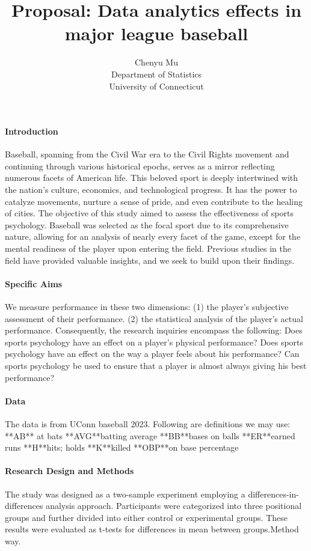 \documentclass[12pt]{article}
\title{Proposal: Data analytics effects in major league baseball}
\author{Chenyu Mu\\
  Department of Statistics\\
  University of Connecticut
}
\begin{document}
\maketitle


\paragraph{Introduction}
Baseball, spanning from the Civil War era to the Civil Rights movement and continuing through various historical epochs,
serves as a mirror reflecting numerous facets of American life. This beloved sport is deeply intertwined with the nation's culture,
economics, and technological progress. It has the power to catalyze movements, nurture a sense of pride, and even contribute to the healing of cities.
The objective of this study aimed to assess the effectiveness of sports psychology. Baseball was selected as the focal sport due to its comprehensive nature,
allowing for an analysis of nearly every facet of the game, except for the mental readiness of the player upon entering the field. Previous studies 
in the field \citep[e.g.,][]{Dalmass2018baseball} have provided valuable insights, and we seek to build upon their findings. 


\lipsum[1]

\paragraph{Specific Aims}
We measure performance in these two dimensions: (1) the player's subjective assessment of their performance. 
(2) the statistical analysis of the player's actual performance. Consequently, the research inquiries encompass the following:
Does sports psychology have an effect on a player's physical performance?
Does sports psychology have an effect on the way a player feels about his performance?
Can sports psychology be used to ensure that a player is almost always giving his best performance?

\lipsum[2]

\paragraph{Data}
The data is from UConn baseball 2023. Following are definitions we may use:
**AB** at bats 
**AVG**batting average 
**BB**bases on balls 
**ER**earned runs
**H**hits; holds
**K**killed 
**OBP**on base percentage

\lipsum[3]

\paragraph{Research Design and Methods}
The study was designed as a two-sample experiment employing a differences-in-differences analysis approach.
Participants were categorized into three positional groups and further divided into either control or experimental groups. 
These results were evaluated as t-tests for differences in mean between groups.Method way\citep[e.g.,][]{Dalmass2018baseball}.
\end{document}
